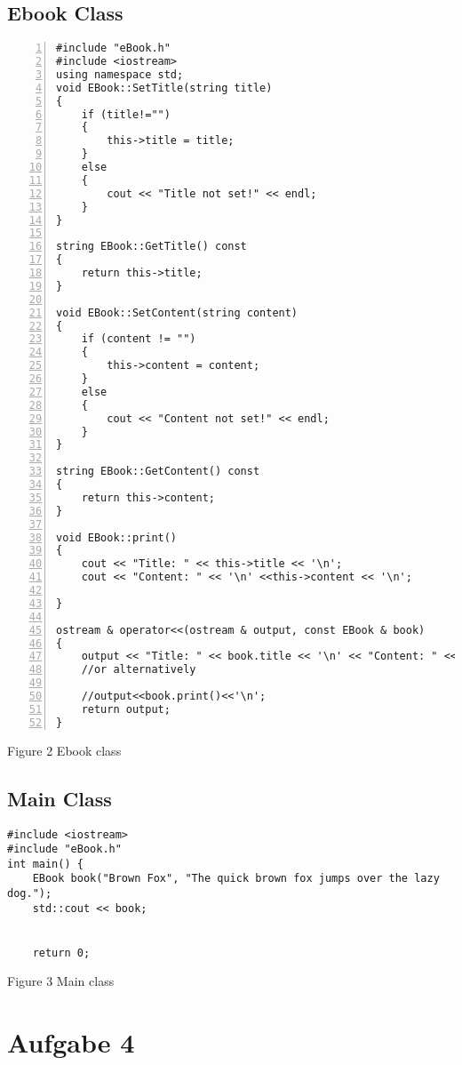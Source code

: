 \documentclass{llncs}
\begin{document}
\newpage
\subsection{Ebook Class}
\begin{lstlisting}[basicstyle=\footnotesize\ttfamily, numbers=left, stepnumber=1, numberstyle = \normalsize]
#include "eBook.h"
#include <iostream>
using namespace std;
void EBook::SetTitle(string title)
{
	if (title!="")
	{
		this->title = title;
	}
	else
	{
		cout << "Title not set!" << endl;
	}
}

string EBook::GetTitle() const
{
	return this->title;
}

void EBook::SetContent(string content)
{
	if (content != "")
	{
		this->content = content;
	}
	else
	{
		cout << "Content not set!" << endl;
	}
}

string EBook::GetContent() const
{
	return this->content;
}

void EBook::print()
{
	cout << "Title: " << this->title << '\n';
	cout << "Content: " << '\n' <<this->content << '\n';

}

ostream & operator<<(ostream & output, const EBook & book)
{
	output << "Title: " << book.title << '\n' << "Content: " << book.content << '\n';
	//or alternatively 

	//output<<book.print()<<'\n';
	return output;
}
\end{lstlisting}
\footnotesize{Figure 2 Ebook class}\newline
\subsection{Main Class}

\begin{lstlisting}
#include <iostream>
#include "eBook.h"
int main() {
	EBook book("Brown Fox", "The quick brown fox jumps over the lazy dog.");
	std::cout << book; 


	return 0; 

\end{lstlisting}
\footnotesize{Figure 3 Main class}
\section{Aufgabe 4}
\end{document}

